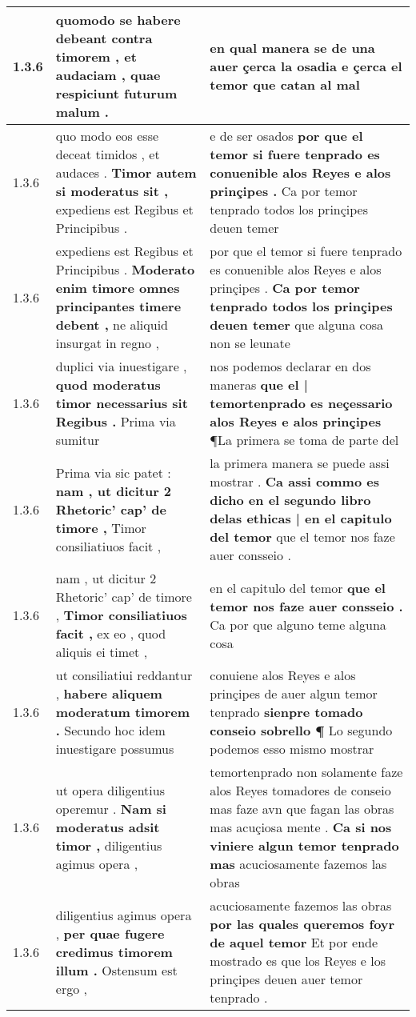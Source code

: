 \begin{tabular}{|p{1cm}|p{6.5cm}|p{6.5cm}|}
1.3.6 & quomodo se habere debeant \textbf{ contra timorem , et audaciam , } quae respiciunt futurum malum . & en qual manera se de una auer çerca la osadia \textbf{ e çerca el temor } que catan al mal \\\hline
1.3.6 & quo modo eos esse deceat timidos , et audaces . \textbf{ Timor autem si moderatus sit , } expediens est Regibus et Principibus . & e de ser osados \textbf{ por que el temor si fuere tenprado es conuenible alos Reyes e alos prinçipes . } Ca por temor tenprado todos los prinçipes deuen temer \\\hline
1.3.6 & expediens est Regibus et Principibus . \textbf{ Moderato enim timore omnes principantes timere debent , } ne aliquid insurgat in regno , & por que el temor si fuere tenprado es conuenible alos Reyes e alos prinçipes . \textbf{ Ca por temor tenprado todos los prinçipes deuen temer } que alguna cosa non se leunate \\\hline
1.3.6 & duplici via inuestigare , \textbf{ quod moderatus timor necessarius sit Regibus . } Prima via sumitur & nos podemos declarar en dos maneras \textbf{ que el | temortenprado es neçessario alos Reyes e alos prinçipes } ¶La primera se toma de parte del \\\hline
1.3.6 & Prima via sic patet : \textbf{ nam , ut dicitur 2 Rhetoric’ cap’ de timore , } Timor consiliatiuos facit , & la primera manera se puede assi mostrar . \textbf{ Ca assi commo es dicho en el segundo libro delas ethicas | en el capitulo del temor } que el temor nos faze auer consseio . \\\hline
1.3.6 & nam , ut dicitur 2 Rhetoric’ cap’ de timore , \textbf{ Timor consiliatiuos facit , } ex eo , quod aliquis ei timet , & en el capitulo del temor \textbf{ que el temor nos faze auer consseio . } Ca por que alguno teme alguna cosa \\\hline
1.3.6 & ut consiliatiui reddantur , \textbf{ habere aliquem moderatum timorem . } Secundo hoc idem inuestigare possumus & conuiene alos Reyes e alos prinçipes de auer algun temor tenprado \textbf{ sienpre tomado conseio sobrello ¶ } Lo segundo podemos esso mismo mostrar \\\hline
1.3.6 & ut opera diligentius operemur . \textbf{ Nam si moderatus adsit timor , } diligentius agimus opera , & temortenprado non solamente faze alos Reyes tomadores de conseio mas faze avn que fagan las obras mas acuçiosa mente . \textbf{ Ca si nos viniere algun temor tenprado mas } acuciosamente fazemos las obras \\\hline
1.3.6 & diligentius agimus opera , \textbf{ per quae fugere credimus timorem illum . } Ostensum est ergo , & acuciosamente fazemos las obras \textbf{ por las quales queremos foyr de aquel temor } Et por ende mostrado es que los Reyes e los prinçipes deuen auer temor tenprado . \\\hline

\end{tabular}
